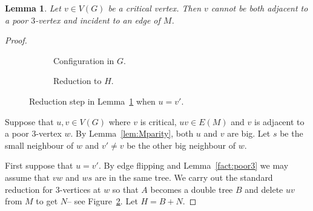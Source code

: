 \documentclass[11pt, reqno, a4paper]{article}
\newtheorem{lemma}{Lemma}[section]
\theoremstyle{definition}
\numberwithin{equation}{section}
\begin{document}
\begin{lemma}\label{lem:Mcrit}
Let $v\in V(G)$ be a critical vertex. 
Then $v$ cannot be both adjacent to a poor $3$-vertex and incident to an edge of $M$.
\end{lemma}
\begin{proof}
\begin{figure}[ht] 
	\centering
    \begin{subfigure}{0.4\textwidth}
    \centering
	\caption{Configuration in $G$.}
    \end{subfigure}
    \begin{subfigure}{0.4\textwidth}
    \centering
	\caption{Reduction to $H$.}
	\label{fig:redgeneral3eqb}
    \end{subfigure}
    \caption{Reduction step in Lemma~\ref{lem:Mcrit} when $u = v'$.}
\end{figure}
Suppose that $u,v\in V(G)$ where $v$ is critical, $uv\in E(M)$ and $v$ is adjacent to a poor $3$-vertex $w$. By Lemma~\ref{lem:Mparity}, both \(u\) and \(v\) are big.
Let $s$ be the small neighbour of $w$ and $v'\neq v$ be the other big neighbour of $w$.

First suppose that $u = v'$. By edge flipping and Lemma~\ref{fact:poor3} we may assume that $vw$ and $ws$ are in the same tree.  We carry out the standard reduction for $3$-vertices at $w$ so that $A$ becomes a double tree $B$ and delete $uv$ from $M$ to get $N$-- see Figure~\ref{fig:redgeneral3eqb}. Let $H = B + N$.


\end{proof}
\end{document}
